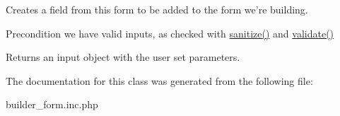Creates a field from this form to be added to the form we're building. 

\begin{DoxyPrecond}{Precondition}
we have valid inputs, as checked with \hyperlink{classforms_a2494aca1309491b0ba423e233f4210b3}{sanitize()} and \hyperlink{classforms_a80d7d5c6d738b6f42cfbb258b3c3a3d1}{validate()} 
\end{DoxyPrecond}
\begin{DoxyReturn}{Returns}
an input object with the user set parameters. 
\end{DoxyReturn}


The documentation for this class was generated from the following file\-:\begin{DoxyCompactItemize}
\item 
builder\-\_\-form.\-inc.\-php\end{DoxyCompactItemize}
